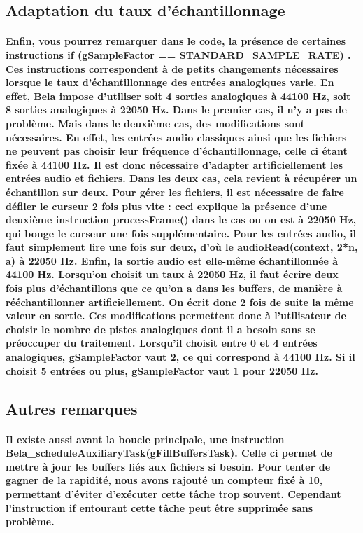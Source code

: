 \documentclass[a4paper]{article}
\begin{document}
\subsection{Adaptation du taux d'échantillonnage} \paragraph{Enfin, vous pourrez
remarquer dans le code, la présence de certaines instructions if (gSampleFactor ==
STANDARD\_SAMPLE\_RATE) . Ces instructions correspondent à de petits changements
nécessaires lorsque le taux d’échantillonnage des entrées analogiques varie. En
effet, Bela impose d’utiliser soit 4 sorties analogiques à 44100 Hz, soit 8
sorties analogiques à 22050 Hz. Dans le premier cas, il n’y a pas de problème.
Mais dans le deuxième cas, des modifications sont nécessaires. En effet, les
entrées audio classiques ainsi que les fichiers ne peuvent pas choisir leur
fréquence d’échantillonnage, celle ci étant fixée à 44100 Hz. Il est donc
nécessaire d’adapter artificiellement les entrées audio et fichiers. Dans les
deux cas, cela revient à récupérer un échantillon sur deux. Pour gérer les
fichiers, il est nécessaire de faire défiler le curseur 2 fois plus vite : ceci
explique la présence d’une deuxième instruction processFrame() dans le cas ou on
est à 22050 Hz, qui bouge le curseur une fois supplémentaire. Pour les entrées
audio, il faut simplement lire une fois sur deux, d’où le audioRead(context,
2*n, a) à 22050 Hz. Enfin, la sortie audio est elle-même échantillonnée à 44100
Hz. Lorsqu’on choisit un taux à 22050 Hz, il faut écrire deux fois plus
d’échantillons que ce qu’on a dans les buffers, de manière à rééchantillonner
artificiellement. On écrit donc 2 fois de suite la même valeur en sortie. Ces
modifications permettent donc à l’utilisateur de choisir le nombre de pistes
analogiques dont il a besoin sans se préoccuper du traitement. Lorsqu’il choisit
entre 0 et 4 entrées analogiques, gSampleFactor vaut 2, ce qui correspond à
44100 Hz. Si il choisit 5 entrées ou plus, gSampleFactor vaut 1 pour 22050 Hz.}

\subsection{Autres remarques} \paragraph{Il existe aussi avant la boucle
principale, une instruction \\ Bela\_scheduleAuxiliaryTask(gFillBuffersTask). Celle
ci permet de mettre à jour les buffers liés aux fichiers si besoin. Pour tenter
de gagner de la rapidité, nous avons rajouté un compteur fixé à 10, permettant
d’éviter d’exécuter cette tâche trop souvent. Cependant l’instruction if
entourant cette tâche peut être supprimée sans problème.}
\end{document}
